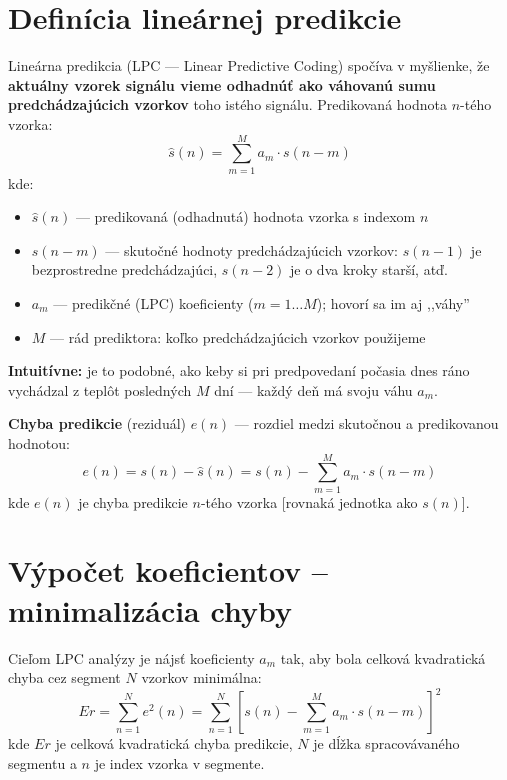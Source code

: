 \section{Definícia lineárnej predikcie}

Lineárna predikcia (LPC --- Linear Predictive Coding) spočíva v myšlienke,
že \textbf{aktuálny vzorek signálu vieme odhadnúť ako váhovanú sumu
predchádzajúcich vzorkov} toho istého signálu. Predikovaná hodnota $n$-tého
vzorka:
\[
  \hat{s}(n) = \sum_{m=1}^{M} a_m \cdot s(n-m)
\]
kde:
\begin{itemize}
  \item $\hat{s}(n)$ --- predikovaná (odhadnutá) hodnota vzorka s indexom $n$
  \item $s(n-m)$ --- skutočné hodnoty predchádzajúcich vzorkov: $s(n-1)$ je
        bezprostredne predchádzajúci, $s(n-2)$ je o dva kroky starší, atď.
  \item $a_m$ --- predikčné (LPC) koeficienty ($m = 1 \ldots M$); hovorí sa
        im aj ,,váhy''
  \item $M$ --- rád prediktora: koľko predchádzajúcich vzorkov použijeme
\end{itemize}

\textbf{Intuitívne:} je to podobné, ako keby si pri predpovedaní počasia
dnes ráno vychádzal z teplôt posledných $M$ dní --- každý deň má svoju váhu
$a_m$.

\textbf{Chyba predikcie} (reziduál) $e(n)$ --- rozdiel medzi skutočnou
a predikovanou hodnotou:
\[
  e(n) = s(n) - \hat{s}(n) = s(n) - \sum_{m=1}^{M} a_m \cdot s(n-m)
\]
kde $e(n)$ je chyba predikcie $n$-tého vzorka [rovnaká jednotka ako $s(n)$].

\section{Výpočet koeficientov -- minimalizácia chyby}

Cieľom LPC analýzy je nájsť koeficienty $a_m$ tak, aby bola celková
kvadratická chyba cez segment $N$ vzorkov minimálna:
\[
  Er = \sum_{n=1}^{N} e^2(n)
     = \sum_{n=1}^{N} \left[s(n) - \sum_{m=1}^{M} a_m \cdot s(n-m)\right]^2
\]
kde $Er$ je celková kvadratická chyba predikcie, $N$ je dĺžka spracovávaného
segmentu a $n$ je index vzorka v segmente.

